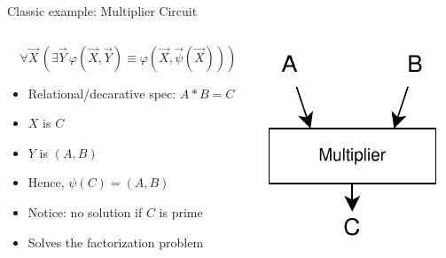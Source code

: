 \documentclass[aspectratio=169]{beamer}
\begin{document}
\begin{frame}{Classic example: Multiplier Circuit}
\begin{columns}
\begin{column}{0.48\textwidth}
        \[
            \forall \vec{X}\, \left( \exists \vec{Y}\, \varphi(\vec{X}, \vec{Y}) \equiv \varphi(\vec{X}, \vec{\psi}(\vec{X})) \right)
        \]
\begin{itemize}
    \item Relational/decarative spec: $A * B = C$
    \item $X$ is $C$
    \item $Y$ is $(A, B)$
    \item Hence, $\psi(C) = (A, B)$
    \item Notice: no solution if $C$ is prime
    \item Solves the factorization problem
\end{itemize}
\end{column}
\begin{column}{0.48\textwidth}
    \begin{center}
    \includegraphics[scale=1.2]{mult.pdf}
    \end{center}
\end{column}
\end{columns}
\end{frame}
\end{document}
